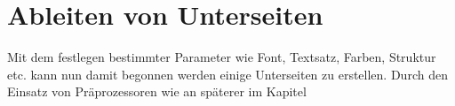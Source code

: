 \section{Ableiten von Unterseiten}
Mit dem festlegen bestimmter Parameter wie Font, Textsatz, Farben, Struktur etc. kann nun damit begonnen werden einige Unterseiten zu erstellen. Durch den Einsatz von Präprozessoren wie an späterer im Kapitel 